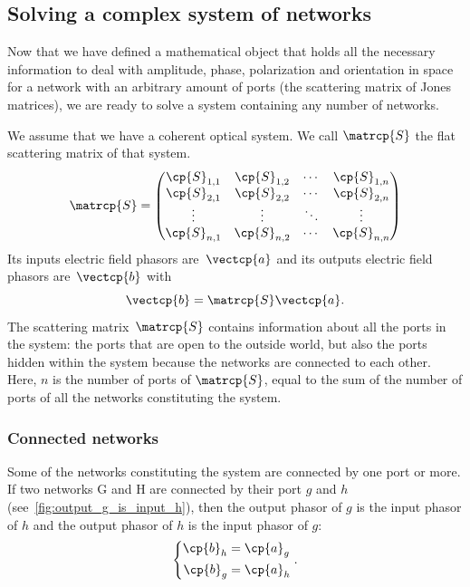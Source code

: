 \subsection{Solving a complex system of networks}
\label{sec:solving_a_system}
Now that we have defined a mathematical object that holds all the necessary information to deal with amplitude, phase, polarization and orientation in space for a network with an arbitrary amount of ports (the scattering matrix of Jones matrices), we are ready to solve a system containing any number of networks.

We assume that we have a coherent optical system.
We call $\matrcp{S}$ the flat scattering matrix of that system.
\begin{equation*}
    \matrcp{S} =
    \begin{pmatrix}
        \cp{S}_{1, 1} & \cp{S}_{1, 2} & \cdots & \cp{S}_{1, n} \\
        \cp{S}_{2, 1} & \cp{S}_{2, 2} & \cdots & \cp{S}_{2, n} \\
        \vdots   & \vdots   & \ddots & \vdots \\
        \cp{S}_{n, 1} & \cp{S}_{n, 2} & \cdots & \cp{S}_{n, n}
    \end{pmatrix}
\end{equation*}
Its inputs electric field phasors are~$\vectcp{a}$ and its outputs electric field phasors are~$\vectcp{b}$ with
\begin{equation*}
    \vectcp{b} = \matrcp{S} \vectcp{a}
    \text{.}
\end{equation*}
The scattering matrix~$\matrcp{S}$ contains information about all the ports in the system: the ports that are open to the outside world, but also the ports hidden within the system because the networks are connected to each other.
Here, $n$ is the number of ports of $\matrcp{S}$, equal to the sum of the number of ports of all the networks constituting the system.




\subsubsection{Connected networks}

Some of the networks constituting the system are connected by one port or more.
If two networks G and H are connected by their port $g$ and $h$ (see~\cref{fig:output_g_is_input_h}), then the output phasor of $g$ is the input phasor of $h$ and the output phasor of $h$ is the input phasor of $g$:
\begin{equation}
    \left\lbrace
    \begin{aligned}
        \cp{b}_h &= \cp{a}_g \\
        \cp{b}_g &= \cp{a}_h
    \end{aligned}
    \right.
    \label{eq:connected_inputs_outputs}
    \text{.}
\end{equation}

